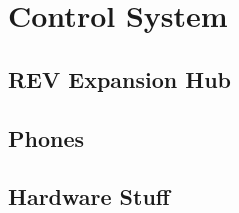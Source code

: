\documentclass[../main.tex]{subfiles}
\begin{document}
\newpage
\section{Control System}
\subsection{REV Expansion Hub}
\subsection{Phones}
\subsection{Hardware Stuff}
\end{document}
